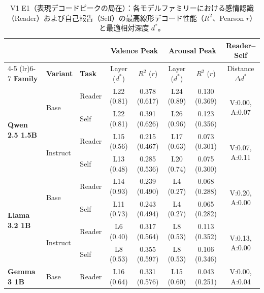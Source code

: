 
\begin{table}[htbp]
\centering
\small
\caption{V1 E1（表現デコードピークの局在）：各モデルファミリーにおける感情認識（Reader）および自己報告（Self）の最高線形デコード性能（$R^2$、Pearson $r$）と最適相対深度 $d^*$。}
\label{tab:v1_peak_decodability}
\begin{tabular}{lll cccc c}
\toprule
 & & & \multicolumn{2}{c}{\textbf{Valence Peak}} & \multicolumn{2}{c}{\textbf{Arousal Peak}} & \textbf{Reader--Self} \\
\cmidrule(lr){4-5} \cmidrule(lr){6-7}
\textbf{Family} & \textbf{Variant} & \textbf{Task} & Layer ($d^*$) & $R^2$ ($r$) & Layer ($d^*$) & $R^2$ ($r$) & Distance $\Delta d^*$ \\
\midrule
\multirow{4}{*}{\textbf{Qwen 2.5 1.5B}} & \multirow{2}{*}{Base} & Reader & L22 (0.81) & 0.378 (0.617) & L24 (0.89) & 0.130 (0.369) & \multirow{2}{*}{V:0.00, A:0.07} \\
                                 &  & Self   & L22 (0.81) & 0.391 (0.626) & L26 (0.96) & 0.123 (0.356) &  \\
\cmidrule(lr){2-8}
                                 & \multirow{2}{*}{Instruct} & Reader & L15 (0.56) & 0.215 (0.467) & L17 (0.63) & 0.073 (0.301) & \multirow{2}{*}{V:0.07, A:0.11} \\
                                 &  & Self   & L13 (0.48) & 0.285 (0.536) & L20 (0.74) & 0.075 (0.300) &  \\
\midrule
\multirow{4}{*}{\textbf{Llama 3.2 1B}} & \multirow{2}{*}{Base} & Reader & L14 (0.93) & 0.239 (0.490) & L4 (0.27) & 0.068 (0.288) & \multirow{2}{*}{V:0.20, A:0.00} \\
                                 &  & Self   & L11 (0.73) & 0.243 (0.494) & L4 (0.27) & 0.065 (0.282) &  \\
\cmidrule(lr){2-8}
                                 & \multirow{2}{*}{Instruct} & Reader & L6 (0.40) & 0.317 (0.564) & L8 (0.53) & 0.113 (0.352) & \multirow{2}{*}{V:0.13, A:0.00} \\
                                 &  & Self   & L8 (0.53) & 0.355 (0.597) & L8 (0.53) & 0.106 (0.346) &  \\
\midrule
\multirow{4}{*}{\textbf{Gemma 3 1B}} & \multirow{2}{*}{Base} & Reader & L16 (0.64) & 0.331 (0.576) & L15 (0.60) & 0.043 (0.251) & \multirow{2}{*}{V:0.00, A:0.04} \\

\end{tabular}
\end{table}
